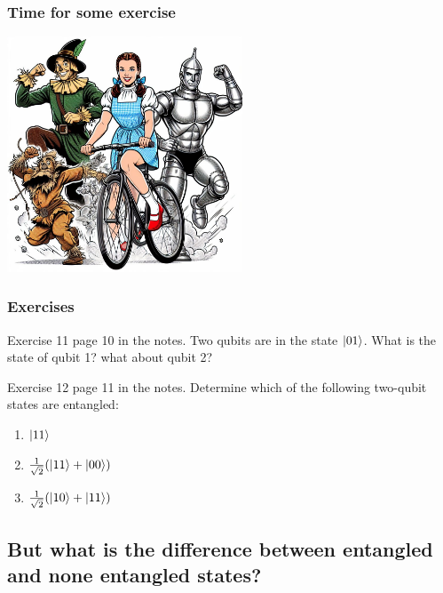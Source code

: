 \documentclass[10pt]{beamer}
\begin{document}
\begin{frame}
  \frametitle{Time for some exercise}
  \centering
  \includegraphics[width=7cm]{img/exercise.jpeg}
\end{frame}

\begin{frame}
  \frametitle{Exercises}
  \begin{block}{Exercise 11 page 10 in the notes.}
    Two qubits are in the state $\ket{01}$. What is the state of  qubit 1? what about qubit 2?
  \end{block}
  \begin{block}{Exercise 12 page 11 in the notes.}
    Determine which of the following two-qubit states are entangled: 
         \begin{enumerate}
             \item $\ket{11}$
             \item $\frac{1}{\sqrt{2}}(\ket{11}+\ket{00})$
             \item $\frac{1}{\sqrt{2}}(\ket{10}+\ket{11})$ 
         \end{enumerate}
  \end{block}
\end{frame}

\begin{frame}
 \section{But what is the difference between entangled and none entangled states?}
\end{frame}
\end{document}
